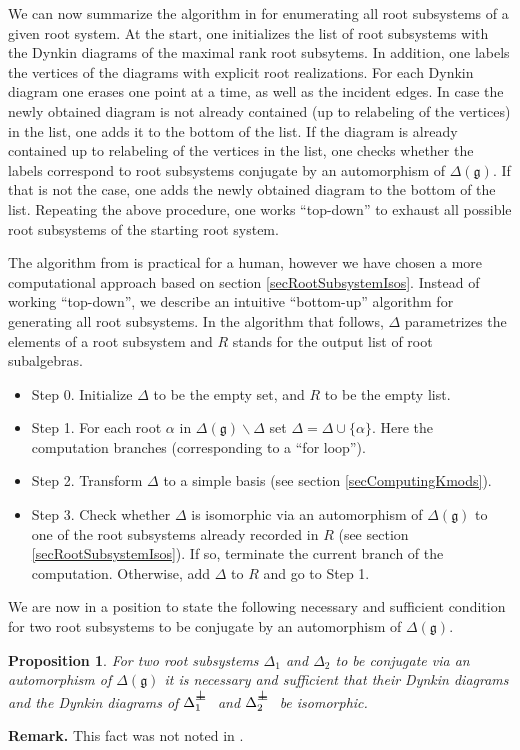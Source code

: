 \documentclass[12pt]{report}
\newtheorem{prop}[theo]{Proposition}
\newcommand{\gG}{\mathfrak{g}}
\def\sperp{{\hbox{$\perp${\hbox{\kern -.77em $-$}\raise-1pt\hbox{\kern -.77em $-$}}\ }}}
\begin{document}
We can now summarize the algorithm in \cite{Dynkin:Semisimple} for enumerating all root subsystems of a given root system. At the start, one initializes the list of root subsystems with the Dynkin diagrams of the maximal rank root subsytems. In addition, one labels the vertices of the diagrams with explicit root realizations. For each Dynkin diagram one erases one point at a time, as well as the incident edges. In case the newly obtained diagram is not already contained (up to relabeling of the vertices) in the list, one adds it to the bottom of the list. If the diagram is already contained up to relabeling of the vertices in the list, one checks whether the labels correspond to root subsystems conjugate by an automorphism of $\Delta(\gG)$. If that is not the case, one adds the newly obtained diagram to the bottom of the list. Repeating the above procedure, one works ``top-down'' to exhaust all possible root subsystems of the starting root system.

The algorithm from \cite{Dynkin:Semisimple} is practical for a human, however we have chosen a more computational approach based on section \ref{secRootSubsystemIsos}. Instead of working ``top-down'', we describe an intuitive ``bottom-up'' algorithm for generating all root subsystems. In the algorithm that follows, $\Delta$ parametrizes the elements of a root subsystem and $R$ stands for the output list of root subalgebras. 
\begin{itemize}
\item Step 0. Initialize $\Delta$ to be the empty set, and $R$ to be the empty list.
\item Step 1. For each root $\alpha$ in $\Delta(\gG)\backslash\Delta$ set $\Delta=\Delta\cup \{\alpha\}$. Here the computation branches (corresponding to a ``for loop'').
\item Step 2. Transform $\Delta$ to a simple basis (see section \ref{secComputingKmods}).
\item Step 3. Check whether $\Delta$ is isomorphic via an automorphism of $\Delta(\gG)$ to one of the root subsystems already recorded in $R$ (see section \ref{secRootSubsystemIsos}). If so, terminate the current branch of the computation. Otherwise, add $\Delta$ to $R$ and go to Step 1.
\end{itemize}
We are now in a position to state the following necessary and sufficient condition for two root subsystems to be conjugate by an automorphism of $\Delta(\gG)$.
\begin{prop}\label{propRootSubsystemsUpToIso}
For two root subsystems $\Delta_1$ and $\Delta_2$ to be conjugate via an automorphism of $\Delta(\gG)$ it is necessary and sufficient that their Dynkin diagrams and the Dynkin diagrams of $\Delta_1^\sperp$ and $\Delta_2^\sperp$ be isomorphic.
\end{prop}
\textbf{Remark.} This fact was not noted in \cite{Dynkin:Semisimple}. 
\end{document}
